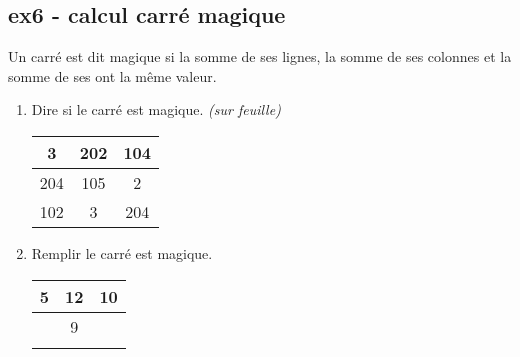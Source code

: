 \documentclass[11pt]{article}
\begin{document}
\begin{multicols}{2}

  \subsection*{ex6 - calcul carré magique}

  Un carré est dit magique si la somme de ses lignes, la somme de ses colonnes et la somme de ses ont la même valeur. 
  \begin{enumerate}
  \item  Dire si le carré est magique. \textit{(sur feuille)}

    \begin{center}
      \begin{tabular}{|c|c|c|} \hline
        3 & 202 & 104 \\ \hline
        204 & 105 &   2 \\ \hline
        102 &   3 & 204 \\ \hline
      \end{tabular}
    \end{center}


  \item  Remplir le carré est magique.
    \begin{center}
      \begin{tabular}{|c|c|c|} \hline
        5 & 12 & 10  \\ \hline
        & 9 &    \\ \hline
        &   &    \\ \hline
      \end{tabular}
    \end{center}

  \end{enumerate}

\end{multicols}
\end{document}
